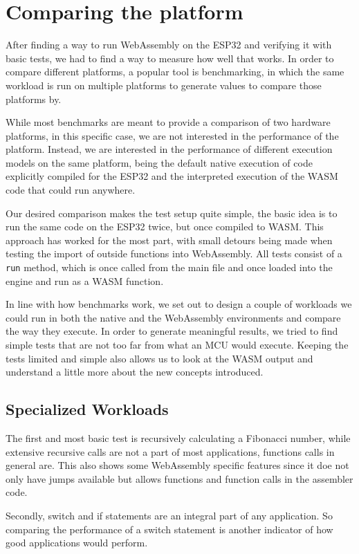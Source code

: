 \section{Comparing the platform}
After finding a way to run WebAssembly on the ESP32 and verifying it with basic tests, we had to find a way to measure how well that works. In order to compare different platforms, a popular tool is benchmarking, in which the same workload is run on multiple platforms to generate values to compare those platforms by.

While most benchmarks are meant to provide a comparison of two hardware platforms, in this specific case, we are not interested in the performance of the platform. Instead, we are interested in the performance of different execution models on the same platform, being the default native execution of code explicitly compiled for the ESP32 and the interpreted execution of the WASM code that could run anywhere.

Our desired comparison makes the test setup quite simple, the basic idea is to run the same code on the ESP32 twice, but once compiled to WASM. This approach has worked for the most part, with small detours being made when testing the import of outside functions into WebAssembly. All tests consist of a \lstinline{run} method, which is once called from the main file and once loaded into the engine and run as a WASM function.

In line with how benchmarks work, we set out to design a couple of workloads we could run in both the native and the WebAssembly environments and compare the way they execute. In order to generate meaningful results, we tried to find simple tests that are not too far from what an MCU would execute. Keeping the tests limited and simple also allows us to look at the WASM output and understand a little more about the new concepts introduced.

\subsection{Specialized Workloads}

The first and most basic test is recursively calculating a Fibonacci number, while extensive recursive calls are not a part of most applications, functions calls in general are. This also shows some WebAssembly specific features since it doe not only have jumps available but allows functions and function calls in the assembler code.

Secondly, switch and if statements are an integral part of any application. So comparing the performance of a switch statement is another indicator of how good applications would perform.

